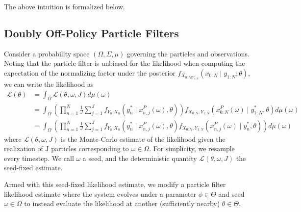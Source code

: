 \documentclass{article}
\begin{document}
The above intuition is formalized below.


\subsection{Doubly Off-Policy Particle Filters}


\begin{defn}
\label{defn:seed-fixing}
Consider a probability space $(\Omega, \Sigma, \mu)$ governing the particles and observations. Noting that the particle filter is unbiased for the likelihood when computing the expectation of the normalizing factor under the posterior $f_{X_{0:N|Y_{1:N}}}\left(x_{0: N} \mid y_{1: N}; \theta\right)$, we can write the likelihood as
$$
\begin{aligned}
\mathcal{L}(\theta) & =\int_{\Omega} \mathcal{L}(\theta, \omega, J) d \mu(\omega) \\
& =\int_{\Omega}\left(\prod_{n=1}^N \frac{1}{J} \sum_{j=1}^J f_{Y_n|X_n}\left(y_n^* \mid x_{n, j}^P(\omega), \theta\right)\right) f_{X_{0:N}, Y_{1:N}}\left(x_{0: N}^P(\omega) \mid y_{1: N}^*, \theta\right) d \mu(\omega) \\
& =\int_{\Omega}\left(\prod_{n=1}^N \frac{1}{J} \sum_{j=1}^J f_{Y_n|X_n}\left(y_n^* \mid x_{n, j}^P(\omega), \theta\right) f_{X_{0:N}, Y_{1:N}}\left(x_{n, j}^P(\omega) \mid y_n^*, \theta\right)\right) d \mu(\omega)
\end{aligned}
$$
where $\mathcal{L}(\theta, \omega, J)$ is the Monte-Carlo estimate of the likelihood given the realization of $\mathrm{J}$ particles corresponding to $\omega \in \Omega$. For simplicity, we resample every timestep. We call $\omega$ a seed, and the deterministic quantity $\mathcal{L}(\theta, \omega, J)$ the seed-fixed estimate.
\end{defn}

Armed with this seed-fixed likelihood estimate, we modify a particle filter likelihood estimate where the system evolves under a parameter $\phi \in \Theta$ and seed $\omega \in \Omega$ to instead evaluate the likelihood at another (sufficiently nearby) $\theta \in \Theta.$ 
\end{document}
